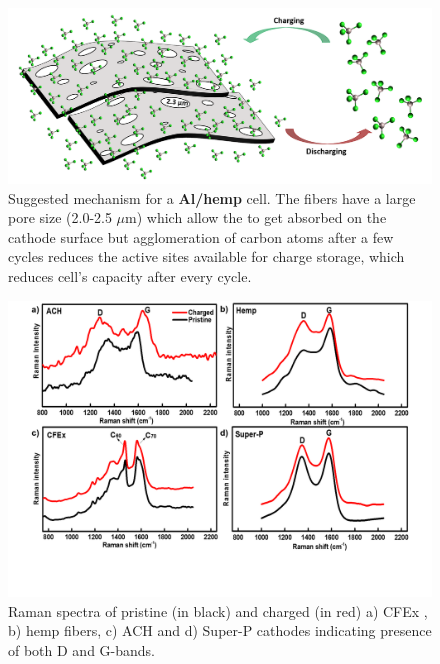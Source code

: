  \begin{figure}[tbh!]
  \centering
  \includegraphics[width=\textwidth]{Figures/chap5fig/hempmech}
    \caption{Suggested mechanism for a \textbf{Al/hemp} cell. The fibers have a large pore size (2.0-2.5 $\mu$m) which allow the  to get absorbed on the cathode surface but agglomeration of carbon atoms after a few cycles reduces the active sites available for charge storage, which reduces cell's capacity after every cycle.}
  \label{Figures/chap5fig:hempmech}
\end{figure}
 \begin{figure}[tbh!]
  \centering
  \includegraphics[width=\textwidth]{Figures/chap5fig/Raman}
    \caption{Raman spectra of pristine (in black) and charged (in red) a) CFEx , b) hemp fibers, c) ACH and d) Super-P cathodes indicating presence of both D and G-bands.}
  \label{Figures/chap5fig:Raman}
\end{figure}
